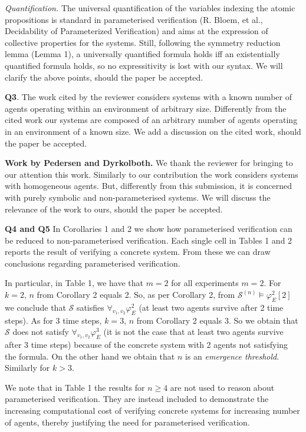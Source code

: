 \documentclass{article}
\begin{document}
{\em Quantification.} The universal quantification of the variables indexing
the atomic propositions is standard in parameterised verification (R. Bloem, et
al., Decidability of Parameterized Verification)  and aims at the expression of
collective properties for the systems. Still, following the symmetry reduction
lemma (Lemma 1), a universally quantified formula holds iff  an existentially
quantified formula holds, so no expressitivity is lost with our syntax.
We will clarify the above points, should the
paper be accepted.

\noindent
\textbf{Q3}. The  work cited by the reviewer considers systems with a known
number of agents operating within an environment of arbitrary size. Differently
from the cited work our systems are composed of an arbitrary number of agents
operating in an environment of a known size. We add a discussion on the cited
work,  should the paper be accepted.


\noindent
\textbf{Work by Pedersen and Dyrkolboth.} We thank the reviewer for bringing to
our attention this work. Similarly to our contribution the work considers
systems with homogeneous agents. But, differently from this submission, it is
concerned with purely symbolic and non-parameterised systems. We will discuss
the relevance of the work to ours, should the paper be accepted.


\noindent
\textbf{Q4 and Q5}
In Corollaries 1 and 2 we show how parameterised
verification can be reduced to non-parameterised verification. Each
single cell in Tables 1 and 2 reports the result of verifying a
concrete system. From these we can draw conclusions regarding
parameterised verification.

In particular, in Table 1, we have that $m=2$ for all experiments $m=2$. For
$k=2$, $n$ from Corollary 2 equals 2. So, as per Corollary 2, from
$\mathcal{S}^{(n)} \models \varphi^2_E[2]$ we conclude that $\mathcal{S}$
satisfies $\forall_{v_1,v_2} \varphi^2_E$ (at least two agents survive after 2
time steps). As for 3 time steps, $k=3$, $n$ from Corollary 2 equals 3. So we
obtain that $\mathcal{S}$ does not satisfy $\forall_{v_1,v_2} \varphi^3_E$ (it
is not the case that at least two agents survive after 3 time steps) because of
the concrete system with 2 agents not satisfying the formula. On the other hand
we obtain that $n$ is an \emph{emergence threshold}. Similarly for $k>3$.

We note that in Table 1 the results for $n\geq 4$ are not used to reason about
parameterised verification. They are instead  included to demonstrate the
increasing computational cost of verifying concrete systems for increasing
number of agents, thereby justifying the need for parameterised verification. 
\end{document}
